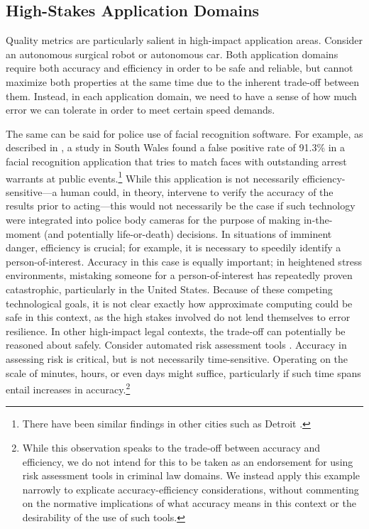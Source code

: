 \documentclass[sigplan,screen]{acmart}
\begin{document}
\subsection{High-Stakes Application Domains} \label{sec:highimpact}
Quality metrics are particularly salient in high-impact application areas. Consider an autonomous surgical robot or autonomous car. Both application domains require both accuracy and efficiency in order to be safe and reliable, but cannot maximize both properties at the same time due to the inherent trade-off between them. Instead, in each application domain, we need to have a sense of how much error we can tolerate in order to meet certain speed demands.

The same can be said for police use of facial recognition software. For example, as described in \citet{Dietterich2018robustAI}, a study in South Wales found a false positive rate of 91.3\% in a facial recognition application that tries to match faces with outstanding arrest warrants at public events.\footnote{There have been similar findings in other cities such as Detroit \cite{lee2020detroit}.} While this application is not necessarily efficiency-sensitive---a human could, in theory, intervene to verify the accuracy of the results prior to acting---this would not necessarily be the case if such technology were integrated into police body cameras for the purpose of making in-the-moment (and potentially life-or-death) decisions. In situations of imminent danger, efficiency is crucial; for example, it is necessary to speedily identify a person-of-interest. Accuracy in this case is equally important; in heightened stress environments, mistaking someone for a person-of-interest has repeatedly proven catastrophic, particularly in the United States. Because of these competing technological goals, it is not clear exactly how approximate computing could be safe in this context, as the high stakes involved do not lend themselves to error resilience. In other high-impact legal contexts, the trade-off can potentially be reasoned about safely. Consider automated risk assessment tools \cite{starr2014risk, Chouldechova2017instruments}. Accuracy in assessing risk is critical, but is not necessarily time-sensitive. Operating on the scale of minutes, hours, or even days might suffice, particularly if such time spans entail increases in accuracy.\footnote{While this observation speaks to the trade-off between accuracy and efficiency, we do not intend for this to be taken as an endorsement for using risk assessment tools in criminal law domains. We instead apply this example narrowly to explicate accuracy-efficiency considerations, without commenting on the normative implications of what accuracy means in this context or the desirability of the use of such tools.}
\end{document}
